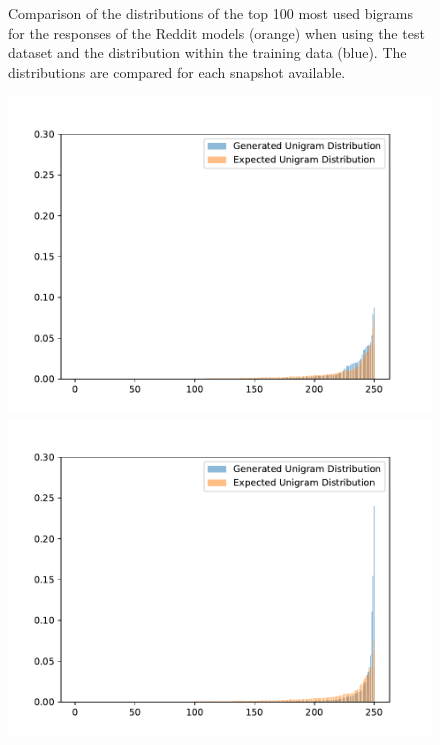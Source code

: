 \begin{figure}[H]
	\centering
	\small
	\endminipage\hfill
	\caption{Comparison of the distributions of the top 100 most used bigrams for the responses of the Reddit models (orange) when using the test dataset and the distribution within the training data (blue). The distributions are compared for each snapshot available.}
	\label{results:bigram:distributions:reddit}
\end{figure}

\begin{figure}[H]
	\includegraphics[width=\linewidth]{img/plots/opensubtitles_not_reversed/unigram_distribution_comparison_step_500000.pdf}
	\centering
	\small
	\endminipage\hfill
	\includegraphics[width=\linewidth]{img/plots/opensubtitles_not_reversed/unigram_distribution_comparison_step_1000000.pdf}

\end{figure}
